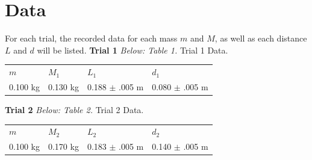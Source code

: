 \documentclass[12pt,letterpaper]{article}
\begin{document}
\section{Data}

For each trial, the recorded data for each mass \(m\) and \(M\), as well as each distance \(L\) and \(d\) will be listed.
\newline\newline
\textbf{Trial 1}
\newline
\textit{Below: Table 1.} Trial 1 Data.
{\renewcommand{\arraystretch}{1.2}
\begin{table}[h]
\hspace{1.1in}
\begin{tabular}{llll}
\hspace{0.4in}\(m\) & \hspace{0.4in}\(M_1\) & \hspace{0.4in} \(L_1\) & \hspace{0.4in} \(d_1\)\\
\hspace{0.2in}0.100 kg \hspace{0.2in}& \hspace{0.2in}0.130 kg\hspace{0.2in}& 0.188 \(\pm\) .005 m & 0.080  \(\pm\) .005 m \\                
\end{tabular}
\end{table}

\hspace{-16pt}\textbf{Trial 2} 
\newline
\textit{Below: Table 2.} Trial 2 Data.
{\renewcommand{\arraystretch}{1.2}
\begin{table}[h]
\hspace{1.1in}
\begin{tabular}{llll}
\hspace{0.4in}\(m\) & \hspace{0.4in}\(M_2\) & \hspace{0.4in} \(L_2\) & \hspace{0.4in} \(d_2\)\\
\hspace{0.2in}0.100 kg \hspace{0.2in}& \hspace{0.2in}0.170 kg\hspace{0.2in}& 0.183 \(\pm\) .005 m & 0.140  \(\pm\) .005 m \\                
\end{tabular}
\end{table}

}}
\end{document}
